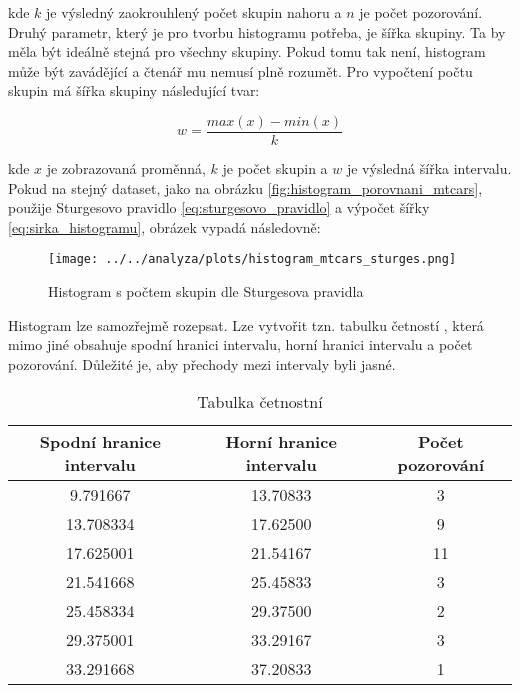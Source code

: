 kde $k$ je výsledný zaokrouhlený počet skupin 
{\color{red}
nahoru
}
a $n$ je počet pozorování. Druhý parametr, který je pro tvorbu histogramu potřeba, je šířka skupiny.
Ta by měla být ideálně stejná pro všechny skupiny. Pokud tomu tak není, histogram může být zavádějící a čtenář mu nemusí plně rozumět.
Pro vypočtení počtu skupin má šířka skupiny následující tvar:

\begin{equation}
    \label{eq:sirka_histogramu}
    w = \frac{max(x) - min(x)}{k}
\end{equation}

{\color{red}
kde $x$ je zobrazovaná proměnná, $k$ je počet skupin a $w$ je výsledná šířka intervalu. Pokud na stejný dataset, jako na obrázku 
\ref{fig:histogram_porovnani_mtcars}, použije Sturgesovo pravidlo \ref{eq:sturgesovo_pravidlo} a výpočet šířky \ref{eq:sirka_histogramu},
obrázek vypadá následovně:
}

\begin{figure}[H]
    \centering
    \texttt{[image: ../../analyza/plots/histogram\_mtcars\_sturges.png]}
    \caption{Histogram s počtem skupin dle Sturgesova pravidla} 
    \label{fig:histogram_mtcars_sturges}
\end{figure}

Histogram lze samozřejmě rozepsat. Lze vytvořit tzn. tabulku četností ,
která mimo jiné obsahuje spodní hranici intervalu, horní hranici intervalu a počet pozorování. Důležité je,
aby přechody mezi intervaly byli jasné.

\begin{table}[H]
    \centering
    \begin{tabular}[t]{c|c|c}
        \hline
        Spodní hranice intervalu & Horní hranice intervalu & Počet pozorování\\
        \hline
        9.791667 & 13.70833 & 3\\
        \hline
        13.708334 & 17.62500 & 9\\
        \hline
        17.625001 & 21.54167 & 11\\
        \hline
        21.541668 & 25.45833 & 3\\
        \hline
        25.458334 & 29.37500 & 2\\
        \hline
        29.375001 & 33.29167 & 3\\
        \hline
        33.291668 & 37.20833 & 1\\
        \hline
    \end{tabular}
    \caption{\label{tab:tabulka_cetnosti_sturges}Tabulka četnostní}
\end{table}

